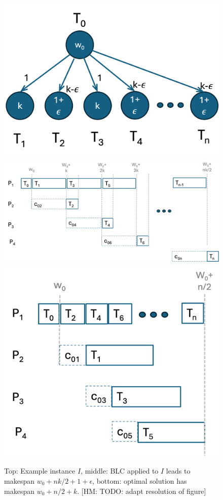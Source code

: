 \documentclass[conference]{IEEEtran}
\newcommand{\hmey}[1]{{\color{red}[HM: #1]}}
\begin{document}
\begin{figure}[tb]
  \centering
  \includegraphics[width=0.6\columnwidth]{images/bad-blc-instance.png} \\[1ex]
  \includegraphics[width=0.999\columnwidth]{images/blc-bad-cost.png} \\[1ex]
  \includegraphics[width=0.67\columnwidth]{images/opt-cost.png}
  \caption{Top: Example instance $I$, middle: BLC applied to $I$ leads to makespan $w_0 + nk/2 + 1+\epsilon$, bottom: optimal solution has makespan $w_0 + n/2 + k$.
  \hmey{TODO: adapt resolution of figure}}
  \label{fig:fork-bad-blc-instance}
\end{figure}
  
\end{document}
